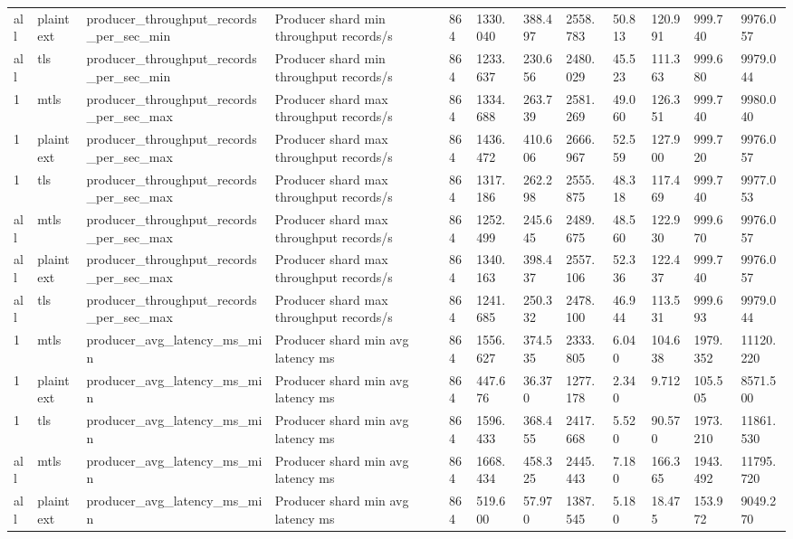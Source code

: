 \begin{longtable}{llllllllllll}
all & plaintext & producer\_throughput\_records\_per\_sec\_min & Producer shard min throughput records/s & 864 & 1330.040 & 388.497 & 2558.783 & 50.813 & 120.991 & 999.740 & 9976.057 \\
all & tls & producer\_throughput\_records\_per\_sec\_min & Producer shard min throughput records/s & 864 & 1233.637 & 230.656 & 2480.029 & 45.523 & 111.363 & 999.680 & 9979.044 \\
1 & mtls & producer\_throughput\_records\_per\_sec\_max & Producer shard max throughput records/s & 864 & 1334.688 & 263.739 & 2581.269 & 49.060 & 126.351 & 999.740 & 9980.040 \\
1 & plaintext & producer\_throughput\_records\_per\_sec\_max & Producer shard max throughput records/s & 864 & 1436.472 & 410.606 & 2666.967 & 52.559 & 127.900 & 999.720 & 9976.057 \\
1 & tls & producer\_throughput\_records\_per\_sec\_max & Producer shard max throughput records/s & 864 & 1317.186 & 262.298 & 2555.875 & 48.318 & 117.469 & 999.740 & 9977.053 \\
all & mtls & producer\_throughput\_records\_per\_sec\_max & Producer shard max throughput records/s & 864 & 1252.499 & 245.645 & 2489.675 & 48.560 & 122.930 & 999.670 & 9976.057 \\
all & plaintext & producer\_throughput\_records\_per\_sec\_max & Producer shard max throughput records/s & 864 & 1340.163 & 398.437 & 2557.106 & 52.336 & 122.437 & 999.740 & 9976.057 \\
all & tls & producer\_throughput\_records\_per\_sec\_max & Producer shard max throughput records/s & 864 & 1241.685 & 250.332 & 2478.100 & 46.944 & 113.531 & 999.693 & 9979.044 \\
1 & mtls & producer\_avg\_latency\_ms\_min & Producer shard min avg latency ms & 864 & 1556.627 & 374.535 & 2333.805 & 6.040 & 104.638 & 1979.352 & 11120.220 \\
1 & plaintext & producer\_avg\_latency\_ms\_min & Producer shard min avg latency ms & 864 & 447.676 & 36.370 & 1277.178 & 2.340 & 9.712 & 105.505 & 8571.500 \\
1 & tls & producer\_avg\_latency\_ms\_min & Producer shard min avg latency ms & 864 & 1596.433 & 368.455 & 2417.668 & 5.520 & 90.570 & 1973.210 & 11861.530 \\
all & mtls & producer\_avg\_latency\_ms\_min & Producer shard min avg latency ms & 864 & 1668.434 & 458.325 & 2445.443 & 7.180 & 166.365 & 1943.492 & 11795.720 \\
all & plaintext & producer\_avg\_latency\_ms\_min & Producer shard min avg latency ms & 864 & 519.600 & 57.970 & 1387.545 & 5.180 & 18.475 & 153.972 & 9049.270 \\

\end{longtable}
